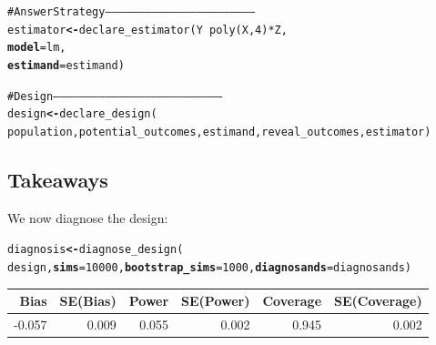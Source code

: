 \documentclass[11pt]{article}\usepackage[]{graphicx}\usepackage[]{color}
\makeatletter
\newcommand{\hlnum}[1]{\textcolor[rgb]{0,0,0}{#1}}%
\newcommand{\hlcom}[1]{\textcolor[rgb]{0.443,0.478,0.702}{#1}}%
\newcommand{\hlopt}[1]{\textcolor[rgb]{0,0,0}{#1}}%
\newcommand{\hlstd}[1]{\textcolor[rgb]{0,0,0}{#1}}%
\newcommand{\hlkwb}[1]{\textcolor[rgb]{0.498,0,0.333}{\textbf{#1}}}%
\newcommand{\hlkwc}[1]{\textcolor[rgb]{0.498,0,0.333}{\textbf{#1}}}%
\newcommand{\hlkwd}[1]{\textcolor[rgb]{0,0,0}{#1}}%
\newenvironment{kframe}{%
 \def\at@end@of@kframe{}%
 \ifinner\ifhmode%
  \def\at@end@of@kframe{\end{minipage}}%
  \begin{minipage}{\columnwidth}%
 \fi\fi%
 \def\FrameCommand##1{\hskip\@totalleftmargin \hskip-\fboxsep
 \colorbox{shadecolor}{##1}\hskip-\fboxsep
     \hskip-\linewidth \hskip-\@totalleftmargin \hskip\columnwidth}%
 \MakeFramed {\advance\hsize-\width
   \@totalleftmargin\z@ \linewidth\hsize
   \@setminipage}}%
 {\par\unskip\endMakeFramed%
 \at@end@of@kframe}
\newenvironment{knitrout}{}{} %
\makeatother
\begin{document}
\begin{codedeclaration}
\begin{knitrout}
\begin{kframe}
\begin{alltt}
\hlcom{# Answer Strategy ---------------------------------------------------------------------}
\hlstd{estimator} \hlkwb{<-} \hlkwd{declare_estimator}\hlstd{(Y} \hlopt{~} \hlkwd{poly}\hlstd{(X,} \hlnum{4}\hlstd{)} \hlopt{*} \hlstd{Z,}
                               \hlkwc{model} \hlstd{= lm,}
                               \hlkwc{estimand} \hlstd{= estimand)}

\hlcom{# Design ------------------------------------------------------------------------------}
\hlstd{design} \hlkwb{<-} \hlkwd{declare_design}\hlstd{(}
    \hlstd{population, potential_outcomes, estimand, reveal_outcomes, estimator)}
\end{alltt}
\end{kframe}
\end{knitrout}

\end{codedeclaration}


\subsection*{Takeaways} 

We now diagnose the design:
\begin{codedeclaration}
\begin{knitrout}\small
{}\color{fgcolor}\begin{kframe}
\begin{alltt}
\hlstd{diagnosis} \hlkwb{<-} \hlkwd{diagnose_design}\hlstd{(}
  \hlstd{design,} \hlkwc{sims} \hlstd{=} \hlnum{10000}\hlstd{,} \hlkwc{bootstrap_sims} \hlstd{=} \hlnum{1000}\hlstd{,} \hlkwc{diagnosands} \hlstd{= diagnosands)}
\end{alltt}
\end{kframe}
\end{knitrout}
\end{codedeclaration}

\begin{table}[ht]
\centering
\begin{tabular}{rrrrrr}
  \hline
Bias & SE(Bias) & Power & SE(Power) & Coverage & SE(Coverage) \\ 
  \hline
-0.057 & 0.009 & 0.055 & 0.002 & 0.945 & 0.002 \\ 
   \hline
\end{tabular}
\end{table}
\end{document}
